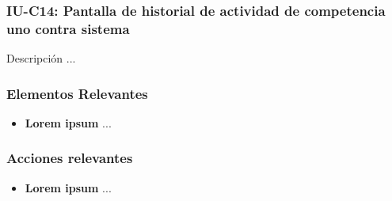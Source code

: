 
\subsubsection{IU-C14: Pantalla de historial de actividad de competencia uno contra sistema}

 Descripción ...


\subsubsection{Elementos Relevantes}

    \begin{itemize}
    \item {\bf Lorem ipsum}
        ...
    \end{itemize}

\subsubsection{Acciones relevantes}

    \begin{itemize}
    \item {\bf Lorem ipsum}
        ...
    \end{itemize}

\clearpage
